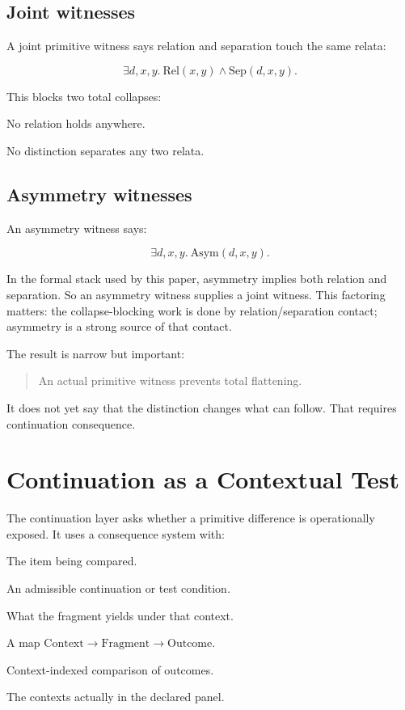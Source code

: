 \documentclass[11pt]{article}
\newcommand{\Rel}{\mathrm{Rel}}
\newcommand{\Sep}{\mathrm{Sep}}
\newcommand{\Asym}{\mathrm{Asym}}
\begin{document}
\subsection{Joint witnesses}

A joint primitive witness says relation and separation touch the same relata:

\[
\exists d,x,y.\ \Rel(x,y) \wedge \Sep(d,x,y).
\]

This blocks two total collapses:

\begin{description}[leftmargin=*]
  \item[RelationCollapse] No relation holds anywhere.
  \item[IdentificationCollapse] No distinction separates any two relata.
\end{description}

\subsection{Asymmetry witnesses}

An asymmetry witness says:

\[
\exists d,x,y.\ \Asym(d,x,y).
\]

In the formal stack used by this paper, asymmetry implies both relation and
separation. So an asymmetry witness supplies a joint witness. This factoring
matters: the collapse-blocking work is done by relation/separation contact;
asymmetry is a strong source of that contact.

The result is narrow but important:

\begin{quote}
An actual primitive witness prevents total flattening.
\end{quote}

It does not yet say that the distinction changes what can follow. That requires
continuation consequence.

\section{Continuation as a Contextual Test}

The continuation layer asks whether a primitive difference is operationally
exposed. It uses a consequence system with:

\begin{description}[leftmargin=*]
  \item[Fragment] The item being compared.
  \item[Context] An admissible continuation or test condition.
  \item[Outcome] What the fragment yields under that context.
  \item[consequence] A map \(\mathrm{Context} \to \mathrm{Fragment} \to
  \mathrm{Outcome}\).
  \item[Compare] Context-indexed comparison of outcomes.
  \item[Evaluated] The contexts actually in the declared panel.
\end{description}
\end{document}
